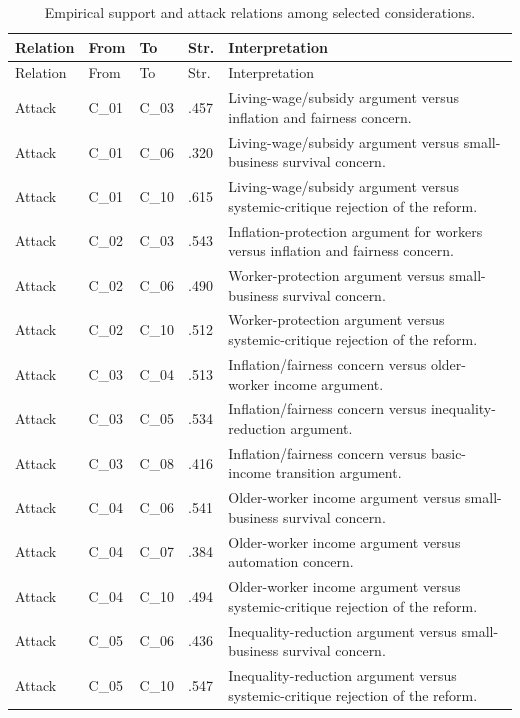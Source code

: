 \begingroup
\scriptsize
\setlength{\tabcolsep}{2pt}
\begin{longtable}{p{0.54in}p{0.45in}p{0.45in}p{0.36in}p{4.20in}}
\caption{Empirical support and attack relations among selected considerations.}\label{tab:consideration-edges}\\
\toprule
Relation & From & To & Str. & Interpretation \\
\midrule
\endfirsthead
\toprule
Relation & From & To & Str. & Interpretation \\
\midrule
\endhead
\bottomrule
\endfoot
Attack & C\_01 & C\_03 & .457 & Living-wage/subsidy argument versus inflation and fairness concern. \\
Attack & C\_01 & C\_06 & .320 & Living-wage/subsidy argument versus small-business survival concern. \\
Attack & C\_01 & C\_10 & .615 & Living-wage/subsidy argument versus systemic-critique rejection of the reform. \\
Attack & C\_02 & C\_03 & .543 & Inflation-protection argument for workers versus inflation and fairness concern. \\
Attack & C\_02 & C\_06 & .490 & Worker-protection argument versus small-business survival concern. \\
Attack & C\_02 & C\_10 & .512 & Worker-protection argument versus systemic-critique rejection of the reform. \\
Attack & C\_03 & C\_04 & .513 & Inflation/fairness concern versus older-worker income argument. \\
Attack & C\_03 & C\_05 & .534 & Inflation/fairness concern versus inequality-reduction argument. \\
Attack & C\_03 & C\_08 & .416 & Inflation/fairness concern versus basic-income transition argument. \\
Attack & C\_04 & C\_06 & .541 & Older-worker income argument versus small-business survival concern. \\
Attack & C\_04 & C\_07 & .384 & Older-worker income argument versus automation concern. \\
Attack & C\_04 & C\_10 & .494 & Older-worker income argument versus systemic-critique rejection of the reform. \\
Attack & C\_05 & C\_06 & .436 & Inequality-reduction argument versus small-business survival concern. \\
Attack & C\_05 & C\_10 & .547 & Inequality-reduction argument versus systemic-critique rejection of the reform. \\

\end{longtable}
